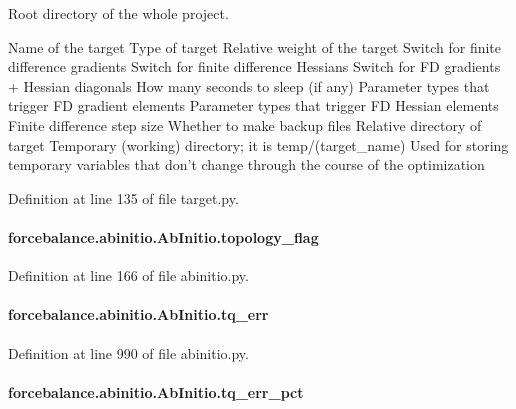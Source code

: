 Root directory of the whole project. 

Name of the target Type of target Relative weight of the target Switch for finite difference gradients Switch for finite difference Hessians Switch for F\-D gradients + Hessian diagonals How many seconds to sleep (if any) Parameter types that trigger F\-D gradient elements Parameter types that trigger F\-D Hessian elements Finite difference step size Whether to make backup files Relative directory of target Temporary (working) directory; it is temp/(target\-\_\-name) Used for storing temporary variables that don't change through the course of the optimization 

Definition at line 135 of file target.\-py.

\hypertarget{classforcebalance_1_1abinitio_1_1AbInitio_a09689e626b75720b097c36f922507950}{
\paragraph[{topology\-\_\-flag}]{\setlength{\rightskip}{0pt plus 5cm}forcebalance.\-abinitio.\-Ab\-Initio.\-topology\-\_\-flag}}\label{classforcebalance_1_1abinitio_1_1AbInitio_a09689e626b75720b097c36f922507950}


Definition at line 166 of file abinitio.\-py.

\hypertarget{classforcebalance_1_1abinitio_1_1AbInitio_ae60e834d5b5bf13f8fb70d403a97db28}{
\paragraph[{tq\-\_\-err}]{\setlength{\rightskip}{0pt plus 5cm}forcebalance.\-abinitio.\-Ab\-Initio.\-tq\-\_\-err}}\label{classforcebalance_1_1abinitio_1_1AbInitio_ae60e834d5b5bf13f8fb70d403a97db28}


Definition at line 990 of file abinitio.\-py.

\hypertarget{classforcebalance_1_1abinitio_1_1AbInitio_a184f2a783b2710f6f75842afdeccf14e}{
\paragraph[{tq\-\_\-err\-\_\-pct}]{\setlength{\rightskip}{0pt plus 5cm}forcebalance.\-abinitio.\-Ab\-Initio.\-tq\-\_\-err\-\_\-pct}}\label{classforcebalance_1_1abinitio_1_1AbInitio_a184f2a783b2710f6f75842afdeccf14e}


